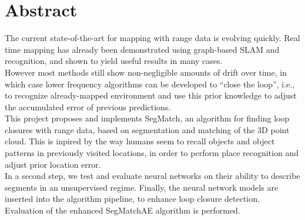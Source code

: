 \chapter*{Abstract}

The current state-of-the-art for mapping with range data is evolving quickly. Real time mapping has already been demonstrated using graph-based SLAM and recognition, and shown to yield useful results in many cases.\\

However most methods still show non-negligible amounts of drift over time, in which case lower frequency algorithms can be developed to “close the loop”, i.e., to recognize already-mapped environment and use this prior knowledge to adjust the accumulated error of previous predictions.\\

This project proposes and implements SegMatch, an algorithm for finding loop closures with range data, based on segmentation and matching of the 3D point cloud. This is inpired by the way humans seem to recall objects and object patterns in previously visited locations, in order to perform place recognition and adjust prior location error.\\ %

In a second step, we test and evaluate neural networks on their ability to describe segments in an unsupervised regime. Finally, the neural network models are inserted into the algorithm pipeline, to enhance loop closure detection. Evaluation of the enhanced SegMatchAE algorithm is performed.\\
